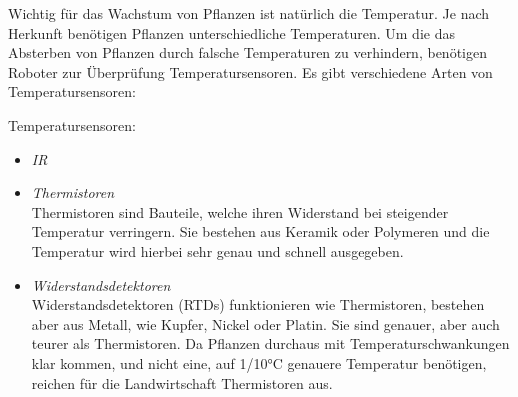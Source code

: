 Wichtig für das Wachstum von Pflanzen ist natürlich die Temperatur. Je nach Herkunft benötigen Pflanzen unterschiedliche Temperaturen.
Um die das Absterben von Pflanzen durch falsche Temperaturen zu verhindern, benötigen Roboter zur Überprüfung Temperatursensoren.
Es gibt verschiedene Arten von Temperatursensoren:

\begin{description}
	\item {Temperatursensoren:}
	\begin{itemize}
		\item {\textit{IR}}
		
		\item {\textit{Thermistoren}}\\
		Thermistoren sind Bauteile, welche ihren Widerstand bei steigender Temperatur verringern. Sie bestehen aus Keramik oder Polymeren und die Temperatur wird hierbei sehr genau und schnell ausgegeben.
		\item {\textit{Widerstandsdetektoren}}\\
		Widerstandsdetektoren (RTDs) funktionieren wie Thermistoren, bestehen aber aus Metall, wie Kupfer, Nickel oder Platin. Sie sind genauer, aber auch teurer als Thermistoren. Da Pflanzen durchaus mit Temperaturschwankungen klar kommen, und nicht eine, auf 1/10°C genauere Temperatur benötigen, reichen für die Landwirtschaft Thermistoren aus.
	\end{itemize}
\end{description}

